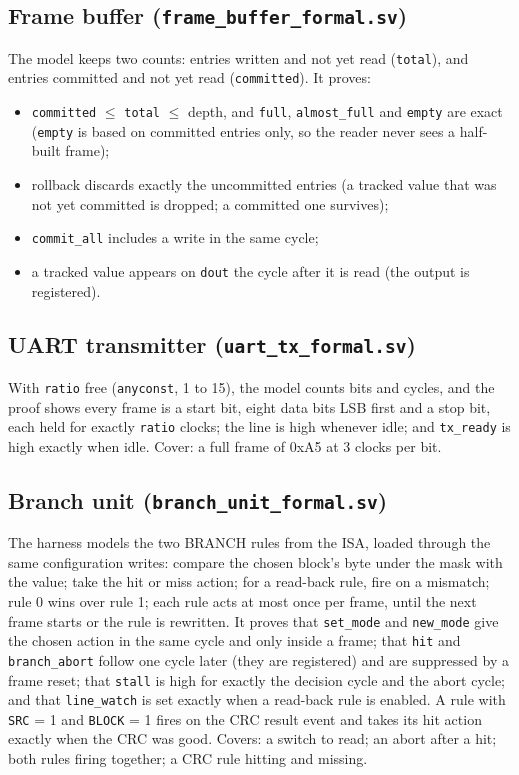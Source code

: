 \documentclass[11pt,a4paper]{article}
\newcommand{\file}[1]{\texttt{#1}}
\begin{document}
\subsection{Frame buffer (\file{frame\_buffer\_formal.sv})}
The model keeps two counts: entries written and not yet read (\texttt{total}), and entries committed and not yet read (\texttt{committed}). It proves:
\begin{itemize}
\item \texttt{committed} $\le$ \texttt{total} $\le$ depth, and \texttt{full}, \texttt{almost\_full} and \texttt{empty} are exact (\texttt{empty} is based on committed entries only, so the reader never sees a half-built frame);
\item rollback discards exactly the uncommitted entries (a tracked value that was not yet committed is dropped; a committed one survives);
\item \texttt{commit\_all} includes a write in the same cycle;
\item a tracked value appears on \texttt{dout} the cycle after it is read (the output is registered).
\end{itemize}

\subsection{UART transmitter (\file{uart\_tx\_formal.sv})}
With \texttt{ratio} free (\texttt{anyconst}, 1 to 15), the model counts bits and cycles, and the proof shows every frame is a start bit, eight data bits LSB first and a stop bit, each held for exactly \texttt{ratio} clocks; the line is high whenever idle; and \texttt{tx\_ready} is high exactly when idle. Cover: a full frame of 0xA5 at 3 clocks per bit.

\subsection{Branch unit (\file{branch\_unit\_formal.sv})}
The harness models the two BRANCH rules from the ISA, loaded through the same configuration writes: compare the chosen block's byte under the mask with the value; take the hit or miss action; for a read-back rule, fire on a mismatch; rule 0 wins over rule 1; each rule acts at most once per frame, until the next frame starts or the rule is rewritten. It proves that \texttt{set\_mode} and \texttt{new\_mode} give the chosen action in the same cycle and only inside a frame; that \texttt{hit} and \texttt{branch\_abort} follow one cycle later (they are registered) and are suppressed by a frame reset; that \texttt{stall} is high for exactly the decision cycle and the abort cycle; and that \texttt{line\_watch} is set exactly when a read-back rule is enabled. A rule with \texttt{SRC} = 1 and \texttt{BLOCK} = 1 fires on the CRC result event and takes its hit action exactly when the CRC was good. Covers: a switch to read; an abort after a hit; both rules firing together; a CRC rule hitting and missing.
\end{document}
